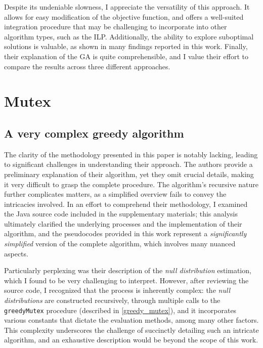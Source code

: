 Despite its undeniable slowness, I appreciate the versatility of this approach. It allows for easy modification of the objective function, and offers a well-suited integration procedure that may be challenging to incorporate into other algorithm types, such as the ILP. Additionally, the ability to explore suboptimal solutions is valuable, as shown in many findings reported in this work. Finally, their explanation of the GA is quite comprehensible, and I value their effort to compare the results across three different approaches.

\section{Mutex}

\subsection{A very complex greedy algorithm}

The clarity of the methodology presented in this paper is notably lacking, leading to significant challenges in understanding their approach. The authors provide a preliminary explanation of their algorithm, yet they omit crucial details, making it very difficult to grasp the complete procedure. The algorithm's recursive nature further complicates matters, as a simplified overview fails to convey the intricacies involved. In an effort to comprehend their methodology, I examined the Java source code included in the supplementary materials; this analysis ultimately clarified the underlying processes and the implementation of their algorithm, and the pseudocodes provided in this work represent a \textit{significantly simplified} version of the complete algorithm, which involves many nuanced aspects.

Particularly perplexing was their description of the \textit{null distribution} estimation, which I found to be very challenging to interpret. However, after reviewing the source code, I recognized that the process is inherently complex: the \textit{null distributions} are constructed recursively, through multiple calls to the \texttt{greedyMutex} procedure (described in \cref{greedy_mutex}), and it incorporates various constants that dictate the evaluation methods, among many other factors. This complexity underscores the challenge of succinctly detailing such an intricate algorithm, and an exhaustive description would be beyond the scope of this work.

